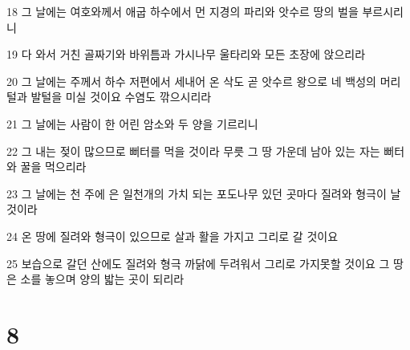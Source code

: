 \par 18 그 날에는 여호와께서 애굽 하수에서 먼 지경의 파리와 앗수르 땅의 벌을 부르시리니
\par 19 다 와서 거친 골짜기와 바위틈과 가시나무 울타리와 모든 초장에 앉으리라
\par 20 그 날에는 주께서 하수 저편에서 세내어 온 삭도 곧 앗수르 왕으로 네 백성의 머리털과 발털을 미실 것이요 수염도 깎으시리라
\par 21 그 날에는 사람이 한 어린 암소와 두 양을 기르리니
\par 22 그 내는 젖이 많으므로 뻐터를 먹을 것이라 무릇 그 땅 가운데 남아 있는 자는 뻐터와 꿀을 먹으리라
\par 23 그 날에는 천 주에 은 일천개의 가치 되는 포도나무 있던 곳마다 질려와 형극이 날 것이라
\par 24 온 땅에 질려와 형극이 있으므로 살과 활을 가지고 그리로 갈 것이요
\par 25 보습으로 갈던 산에도 질려와 형극 까닭에 두려워서 그리로 가지못할 것이요 그 땅은 소를 놓으며 양의 밟는 곳이 되리라

\chapter{8}

